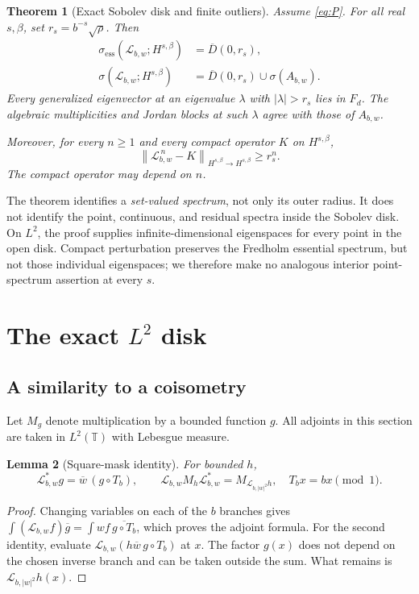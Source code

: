 \documentclass[11pt,a4paper]{article}
\newtheorem{theorem}{Theorem}[section]
\newtheorem{lemma}[theorem]{Lemma}
\theoremstyle{definition}
\theoremstyle{remark}
\newcommand{\T}{\mathbb T}
\newcommand{\Lop}{\mathcal L}
\newcommand{\ess}{\mathrm{ess}}
\newcommand{\norm}[1]{\left\lVert#1\right\rVert}
\newcommand{\Disk}[1]{\overline{D}(0,#1)}
\numberwithin{equation}{section}
\begin{document}
\begin{theorem}[Exact Sobolev disk and finite outliers]
\label{thm:general-spectrum}
Assume \eqref{eq:P}. For all real $s,\beta$, set $r_s=b^{-s}\sqrt\rho$.
Then
\begin{align}
 \sigma_{\ess}(\Lop_{b,w};H^{s,\beta})&=\Disk{r_s},
 \label{eq:general-essential}\\
 \sigma(\Lop_{b,w};H^{s,\beta})&=\Disk{r_s}\cup\sigma(A_{b,w}).
 \label{eq:general-spectrum}
\end{align}
Every generalized eigenvector at an eigenvalue $\lambda$ with $|\lambda|>r_s$
lies in $F_d$. The algebraic multiplicities and Jordan blocks at such
$\lambda$ agree with those of $A_{b,w}$.

Moreover, for every $n\ge1$ and every compact operator $K$ on $H^{s,\beta}$,
\begin{equation}
 \norm{\Lop_{b,w}^{\,n}-K}_{H^{s,\beta}\to H^{s,\beta}}\ge r_s^n.
 \label{eq:compact-obstruction}
\end{equation}
The compact operator may depend on $n$.
\end{theorem}

The theorem identifies a \emph{set-valued spectrum}, not only its outer
radius. It does not identify the point, continuous, and residual spectra
inside the Sobolev disk. On $L^2$, the proof supplies infinite-dimensional
eigenspaces for every point in the open disk. Compact perturbation preserves
the Fredholm essential spectrum, but not those individual eigenspaces; we
therefore make no analogous interior point-spectrum assertion at every $s$.

\section{The exact \texorpdfstring{$L^2$}{L2} disk}
\label{sec:L2}

\subsection{A similarity to a coisometry}
Let $M_g$ denote multiplication by a bounded function $g$. All adjoints in
this section are taken in $L^2(\T)$ with Lebesgue measure.

\begin{lemma}[Square-mask identity]
\label{lem:square-mask}
For bounded $h$,
\begin{equation}
 \Lop_{b,w}^*g=\overline w\,(g\circ T_b),\qquad
 \Lop_{b,w}M_h\Lop_{b,w}^*
       =M_{\Lop_{b,|w|^2}h},\quad T_bx=bx\pmod1.
 \label{eq:square-mask}
\end{equation}
\end{lemma}
\begin{proof}
Changing variables on each of the $b$ branches gives
$\int(\Lop_{b,w}f)\overline g=\int wf\,\overline{g\circ T_b}$,
which proves the adjoint formula. For the second identity, evaluate
$\Lop_{b,w}(h\overline w\,g\circ T_b)$ at $x$. The factor $g(x)$
does not depend on the chosen inverse branch and can be taken outside the
sum. What remains is $\Lop_{b,|w|^2}h(x)$.
\end{proof}
\end{document}
